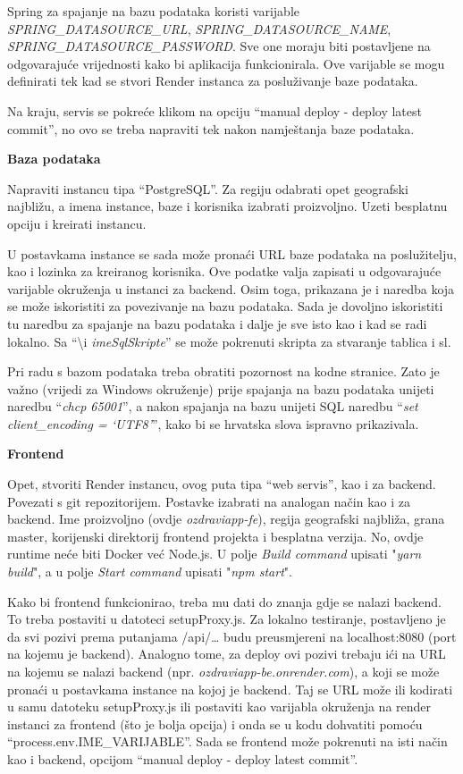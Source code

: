 			 Spring za spajanje na bazu podataka koristi varijable \textit{SPRING\_DATASOURCE\_URL}, \textit{SPRING\_DATASOURCE\_NAME}, \textit{SPRING\_DATASOURCE\_PASSWORD}. Sve one moraju biti postavljene na odgovarajuće vrijednosti kako bi aplikacija funkcionirala. Ove varijable se mogu definirati tek kad se stvori Render instanca za posluživanje baze podataka.
			 
			 Na kraju, servis se pokreće klikom na opciju “manual deploy - deploy latest commit”, no ovo se treba napraviti tek nakon namještanja baze podataka.
			 
			 
			 \textbf{Baza podataka}
			 
			 Napraviti instancu tipa “PostgreSQL”. Za regiju odabrati opet geografski najbližu, a imena instance, baze i korisnika izabrati proizvoljno. Uzeti besplatnu opciju i kreirati instancu.
			 
			 U postavkama instance se sada može pronaći URL baze podataka na poslužitelju, kao i lozinka za kreiranog korisnika. Ove podatke valja zapisati u odgovarajuće varijable okruženja u instanci za backend. Osim toga, prikazana je i naredba koja se može iskoristiti za povezivanje na bazu podataka. Sada je dovoljno iskoristiti tu naredbu za spajanje na bazu podataka i dalje je sve isto kao i kad se radi lokalno. Sa “\textbackslash i  \textit{imeSqlSkripte}” se može pokrenuti skripta za stvaranje tablica i sl.
			 
			 Pri radu s bazom podataka treba obratiti pozornost na kodne stranice. Zato je važno (vrijedi za Windows okruženje) prije spajanja na bazu podataka unijeti naredbu “\textit{chcp 65001}”, a nakon spajanja na bazu unijeti SQL naredbu “\textit{set client\_encoding = ‘UTF8’}”, kako bi se hrvatska slova ispravno prikazivala.
			 
			 
			 \textbf{Frontend}
			 
			 Opet, stvoriti Render instancu, ovog puta tipa “web servis”, kao i za backend. Povezati s git repozitorijem. Postavke izabrati na analogan način kao i za backend. Ime proizvoljno (ovdje \textit{ozdraviapp-fe}), regija geografski najbliža, grana master, korijenski direktorij frontend projekta i besplatna verzija. No, ovdje runtime neće biti Docker već Node.js. U polje \textit{Build command} upisati "\textit{yarn build}", a u polje \textit{Start command} upisati "\textit{npm start}".
			 
			 Kako bi frontend funkcionirao, treba mu dati do znanja gdje se nalazi backend. To treba postaviti u datoteci setupProxy.js. Za lokalno testiranje, postavljeno je da svi pozivi prema putanjama /api/… budu preusmjereni na localhost:8080 (port na kojemu je backend). Analogno tome, za deploy ovi pozivi trebaju ići na URL na kojemu se nalazi backend (npr. \textit{ozdraviapp-be.onrender.com}), a koji se može pronaći u postavkama instance na kojoj je backend.
			 Taj se URL može ili kodirati u samu datoteku setupProxy.js ili postaviti kao varijabla okruženja na render instanci za frontend (što je bolja opcija) i onda se u kodu dohvatiti pomoću “process.env.IME\_VARIJABLE”. Sada se frontend može pokrenuti na isti način kao i backend, opcijom “manual deploy - deploy latest commit”.
			 
